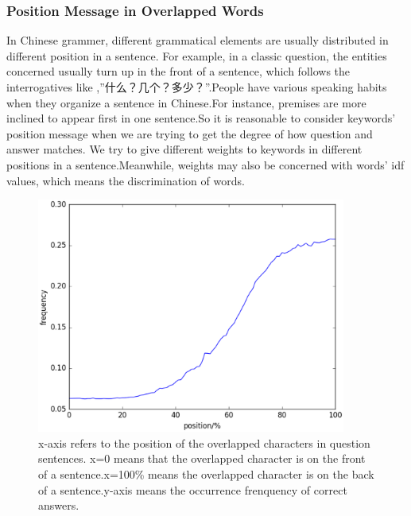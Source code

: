 \documentclass{llncs}
\begin{document}
\subsubsection{Position Message in Overlapped Words}
In Chinese grammer, different grammatical elements are usually distributed in different position in a sentence. For example, in a classic question, the entities concerned usually turn up in the front of a sentence, which follows the interrogatives like ,”什么？几个？多少？”.People have various speaking habits when they organize a sentence in Chinese.For instance, premises are more inclined to appear first in one sentence.So it is reasonable to consider keywords’ position message when we are trying to get the degree of how question and answer matches. We try to give different weights to keywords in different positions in a sentence.Meanwhile, weights may also be concerned with words’ idf values, which means the discrimination of words.

\begin{figure}
\centering
\includegraphics[width=4in]{figures/character_position.eps}
\caption{x-axis refers to the position of the overlapped characters in question sentences. x=0 means that the overlapped character is on the front of  a sentence.x=100\% means the overlapped character is on the back of a sentence.y-axis means the occurrence frenquency of correct answers.}
\label{fig:character_position}
\end{figure}
\end{document}
